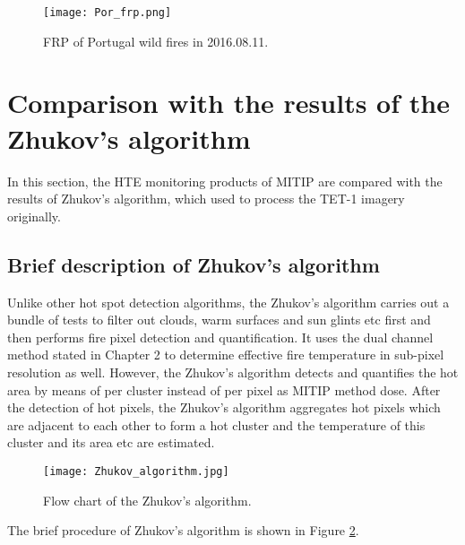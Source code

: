 \begin{figure}[!htbp]
\centering
\texttt{[image: Por\_frp.png]}
\caption{FRP of Portugal wild fires in 2016.08.11.}
\label{fig:Por_frp}
\end{figure}


\section{Comparison with the results of the Zhukov's algorithm}
In this section, the HTE monitoring products of MITIP are compared with the results of Zhukov's algorithm, which used to process the TET-1 imagery originally.\\


\subsection{Brief description of Zhukov's algorithm}
Unlike other hot spot detection algorithms, the Zhukov's algorithm carries out a bundle of tests to filter out clouds, warm surfaces and sun glints etc first and then performs fire pixel detection and quantification. It uses the dual channel method stated in Chapter 2 to determine effective fire temperature in sub-pixel resolution as well. However, the Zhukov's algorithm detects and quantifies the hot area by means of per cluster instead of per pixel as MITIP method dose. After the detection of hot pixels, the Zhukov's algorithm aggregates hot pixels which are adjacent to each other to form a hot cluster and the temperature of this cluster and its area etc are estimated.\\

\begin{figure}[!htbp]
\centering
\texttt{[image: Zhukov\_algorithm.jpg]}
\caption{Flow chart of the Zhukov's algorithm.}
\label{fig:Zhu_alg}
\end{figure}

\noindent The brief procedure of Zhukov's algorithm is shown in Figure \ref{fig:Zhu_alg}.\\



